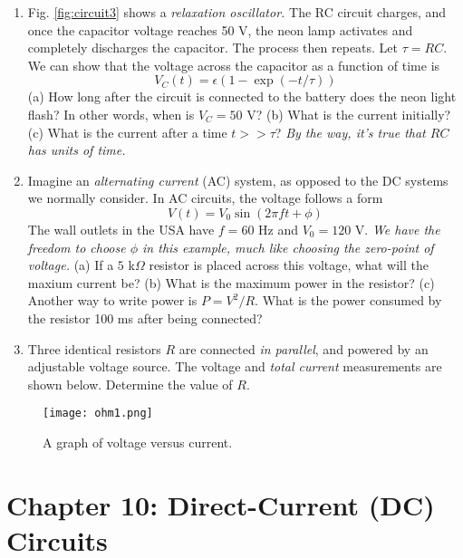 \documentclass[10pt]{article}
\begin{document}
\begin{enumerate}
\item Fig. \ref{fig:circuit3} shows a \textit{relaxation oscillator.}  The RC circuit charges, and once the capacitor voltage reaches 50 V, the neon lamp activates and completely discharges the capacitor.  The process then repeats.  Let $\tau = RC$.  We can show that the voltage across the capacitor as a function of time is
\begin{equation}
V_C(t) = \epsilon \left(1-\exp(-t/\tau)\right)
\end{equation} 
(a) How long after the circuit is connected to the battery does the neon light flash?  In other words, when is $V_C = 50$ V?  (b) What is the current initially?  (c) What is the current after a time $t >> \tau$?  \textit{By the way, it's true that $RC$ has units of time.} \\ \vspace{3cm}
\item Imagine an \textit{alternating current} (AC) system, as opposed to the DC systems we normally consider.  In AC circuits, the voltage follows a form
\begin{equation}
V(t) = V_0 \sin(2\pi f t + \phi)
\end{equation}
The wall outlets in the USA have $f = 60$ Hz and $V_0 = 120$ V.  \textit{We have the freedom to choose $\phi$ in this example, much like choosing the zero-point of voltage.}  (a) If a $5$ k$\Omega$ resistor is placed across this voltage, what will the maxium current be?  (b) What is the maximum power in the resistor?  (c) Another way to write power is $P = V^2 / R$.  What is the power consumed by the resistor 100 ms after being connected?  \\ \vspace{2cm} 
\item Three identical resistors $R$ are connected \textit{in parallel}, and powered by an adjustable voltage source. The voltage and \textit{total current} measurements are shown below. Determine the value of $R$.
\end{enumerate}

\begin{figure}[hb]
\centering
\texttt{[image: ohm1.png]}
\caption{\label{fig:ohm1} A graph of voltage versus current.}
\end{figure}

\clearpage

\section{Chapter 10: Direct-Current (DC) Circuits}
\end{document}
